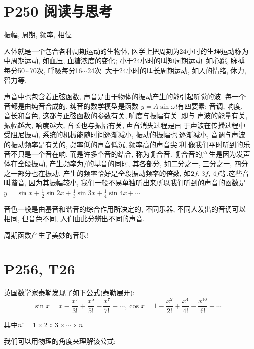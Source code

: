 \documentclass{book}
\begin{document}
    \section{\textcolor[rgb]{0.11,0.65,0.52}{P250 阅读与思考}}
    
    \begin{center}
        振幅, 周期, 频率, 相位
    \end{center}

    人体就是一个包合各种周期运动的生物体, 医学上把周期为24小时的生理运动称为中周期运动, 如血压, 血糖浓度的变化; 小于24小时的叫短周期运动,  如心跳, 脉搏每分50$\sim$70次, 呼吸每分16$\sim$24次; 大于24小时的叫长周期运动, 如人的情绪, 休力, 智力等. 
    
    声音中也包含着正弦函数, 声音是由于物体的振动产生的能引起听觉的波. 每一个音都是由纯音合成的, 纯音的数学模型是函数 $y=A\sin \omega t$有四要素:  音调, 响度, 音长和音色, 这都与正弦函数的参数有关, 响度与振幅有关, 即与 声波的能量有关, 振幅越大, 响度越大, 音长也与振幅有关, 声音消失过程是由 于声波在传播过程中受阻尼振动, 系统的机械能随时间逐渐减小, 振动的振幅也 逐渐减小, 音调与声波的振动频率是有关的, 频率低的声音低沉, 频率高的声音尖
    利.像我们平时听到的乐音不只是一个音在响, 而是许多个音的结合, 称为复合音.  复合音的产生是因为发声体在全段振动, 产生频率为/的基音的同时, 其各部分,  如二分之一, 三分之一, 四分之一部分也在振动, 产生的频率恰好是全段振动频率的倍数, 如2$f$, 3$f$, 4$f$等.这些音叫谐音, 因为其振幅较小, 我们一般不易单独听出来所以我们听到的声音的函数是$\displaystyle y=\sin x+\frac{1}{2}\sin 2x+\frac{1}{3}\sin 3x+\frac{1}{4}\sin 4x+\cdots$

    音色一般是由基音和谐音的综合作用所决定的, 不同乐器, 不同人发出的音调可以相同, 但音色不同, 人们由此分辨出不同的声音.
    
    周期函数产生了美妙的音乐!

    \section{\textcolor[rgb]{0.11,0.65,0.52}{P256, T26}}
    英国数学家泰勒发现了如下公式\textcolor[rgb]{0.38,0.11,0.2}{(泰勒展开)}:
    $$
    \sin x = x - \frac{x^3}{3!}+\frac{x^5}{5!}-\frac{x^7}{7!}+\cdots,
    \cos x = 1-\frac{x^2}{2!}+\frac{x^4}{4!}-\frac{x^36}{6!}+\cdots
    $$

    其中$n!=1\times2\times3\times\cdots\times n$

    我们可以用\textcolor[rgb]{0.75,0.17,0.22}{物理的角度}来理解该公式:
\end{document}
